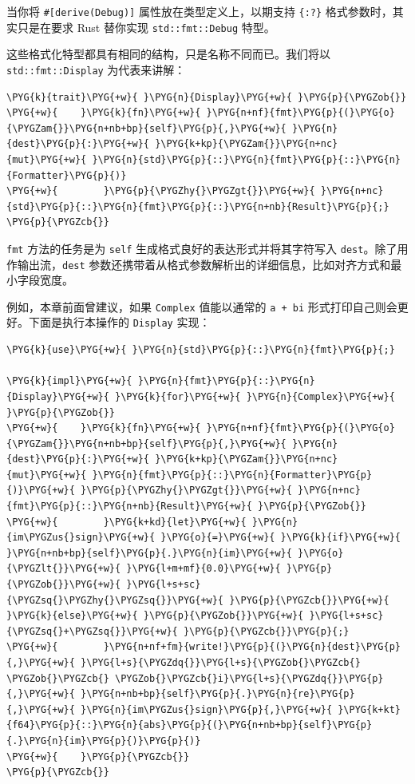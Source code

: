 当你将 \texttt{\#[derive(Debug)]} 属性放在类型定义上，以期支持 \texttt{\{:?\}} 格式参数时，其实只是在要求 Rust 替你实现 \texttt{std::fmt::Debug} 特型。

这些格式化特型都具有相同的结构，只是名称不同而已。我们将以 \texttt{std::fmt::Display} 为代表来讲解：

\begin{Verbatim}[commandchars=\\\{\},breaklines=true,breakanywhere=true,fontsize=\codefont,xleftmargin=17bp]
\PYG{k}{trait}\PYG{+w}{ }\PYG{n}{Display}\PYG{+w}{ }\PYG{p}{\PYGZob{}}
\PYG{+w}{    }\PYG{k}{fn}\PYG{+w}{ }\PYG{n+nf}{fmt}\PYG{p}{(}\PYG{o}{\PYGZam{}}\PYG{n+nb+bp}{self}\PYG{p}{,}\PYG{+w}{ }\PYG{n}{dest}\PYG{p}{:}\PYG{+w}{ }\PYG{k+kp}{\PYGZam{}}\PYG{n+nc}{mut}\PYG{+w}{ }\PYG{n}{std}\PYG{p}{::}\PYG{n}{fmt}\PYG{p}{::}\PYG{n}{Formatter}\PYG{p}{)}
\PYG{+w}{        }\PYG{p}{\PYGZhy{}\PYGZgt{}}\PYG{+w}{ }\PYG{n+nc}{std}\PYG{p}{::}\PYG{n}{fmt}\PYG{p}{::}\PYG{n+nb}{Result}\PYG{p}{;}
\PYG{p}{\PYGZcb{}}
\end{Verbatim}

\texttt{fmt} 方法的任务是为 \texttt{self} 生成格式良好的表达形式并将其字符写入 \texttt{dest}。除了用作输出流，\texttt{dest} 参数还携带着从格式参数解析出的详细信息，比如对齐方式和最小字段宽度。

例如，本章前面曾建议，如果 \texttt{Complex} 值能以通常的 \texttt{a + bi} 形式打印自己则会更好。下面是执行本操作的 \texttt{Display} 实现：

\begin{Verbatim}[commandchars=\\\{\},breaklines=true,breakanywhere=true,fontsize=\codefont,xleftmargin=17bp]
\PYG{k}{use}\PYG{+w}{ }\PYG{n}{std}\PYG{p}{::}\PYG{n}{fmt}\PYG{p}{;}

\PYG{k}{impl}\PYG{+w}{ }\PYG{n}{fmt}\PYG{p}{::}\PYG{n}{Display}\PYG{+w}{ }\PYG{k}{for}\PYG{+w}{ }\PYG{n}{Complex}\PYG{+w}{ }\PYG{p}{\PYGZob{}}
\PYG{+w}{    }\PYG{k}{fn}\PYG{+w}{ }\PYG{n+nf}{fmt}\PYG{p}{(}\PYG{o}{\PYGZam{}}\PYG{n+nb+bp}{self}\PYG{p}{,}\PYG{+w}{ }\PYG{n}{dest}\PYG{p}{:}\PYG{+w}{ }\PYG{k+kp}{\PYGZam{}}\PYG{n+nc}{mut}\PYG{+w}{ }\PYG{n}{fmt}\PYG{p}{::}\PYG{n}{Formatter}\PYG{p}{)}\PYG{+w}{ }\PYG{p}{\PYGZhy{}\PYGZgt{}}\PYG{+w}{ }\PYG{n+nc}{fmt}\PYG{p}{::}\PYG{n+nb}{Result}\PYG{+w}{ }\PYG{p}{\PYGZob{}}
\PYG{+w}{        }\PYG{k+kd}{let}\PYG{+w}{ }\PYG{n}{im\PYGZus{}sign}\PYG{+w}{ }\PYG{o}{=}\PYG{+w}{ }\PYG{k}{if}\PYG{+w}{ }\PYG{n+nb+bp}{self}\PYG{p}{.}\PYG{n}{im}\PYG{+w}{ }\PYG{o}{\PYGZlt{}}\PYG{+w}{ }\PYG{l+m+mf}{0.0}\PYG{+w}{ }\PYG{p}{\PYGZob{}}\PYG{+w}{ }\PYG{l+s+sc}{\PYGZsq{}\PYGZhy{}\PYGZsq{}}\PYG{+w}{ }\PYG{p}{\PYGZcb{}}\PYG{+w}{ }\PYG{k}{else}\PYG{+w}{ }\PYG{p}{\PYGZob{}}\PYG{+w}{ }\PYG{l+s+sc}{\PYGZsq{}+\PYGZsq{}}\PYG{+w}{ }\PYG{p}{\PYGZcb{}}\PYG{p}{;}
\PYG{+w}{        }\PYG{n+nf+fm}{write!}\PYG{p}{(}\PYG{n}{dest}\PYG{p}{,}\PYG{+w}{ }\PYG{l+s}{\PYGZdq{}}\PYG{l+s}{\PYGZob{}\PYGZcb{} \PYGZob{}\PYGZcb{} \PYGZob{}\PYGZcb{}i}\PYG{l+s}{\PYGZdq{}}\PYG{p}{,}\PYG{+w}{ }\PYG{n+nb+bp}{self}\PYG{p}{.}\PYG{n}{re}\PYG{p}{,}\PYG{+w}{ }\PYG{n}{im\PYGZus{}sign}\PYG{p}{,}\PYG{+w}{ }\PYG{k+kt}{f64}\PYG{p}{::}\PYG{n}{abs}\PYG{p}{(}\PYG{n+nb+bp}{self}\PYG{p}{.}\PYG{n}{im}\PYG{p}{)}\PYG{p}{)}
\PYG{+w}{    }\PYG{p}{\PYGZcb{}}
\PYG{p}{\PYGZcb{}}
\end{Verbatim}

